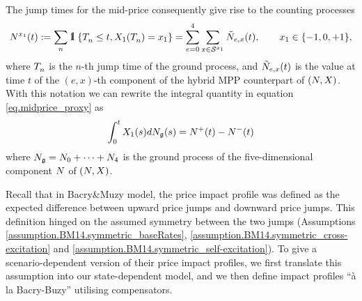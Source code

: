 \documentclass[10pt]{article}
\begin{document}
The jump times for the mid-price consequently give rise to the counting processes 
\begin{equation}\label{eq.jump_times}
 \countingProc[]^{x_{1}}(t) := \sum_{n}\one\left\lbrace \arrivalTimes[]_n\leq t , \stateVariable_1(\arrivalTimes[]_n) = x_1 \right\rbrace
 =
 \sum_{e=0}^{4} \sum_{x\in\stateSpace^{x_1}} \hybridHawkes_{e,x}(t),
 \qquad x_1 \in \lbrace-1,0,+1\rbrace,
\end{equation}
where $\arrivalTimes[]_n$ is the $n$-th jump time of the ground process, and $\hybridHawkes_{e,x}(t)$ is the value at time $t$ of the $(e,x)$-th component of the hybrid MPP counterpart of $(\multiCountingProc,\stateVariable)$.
With this notation we can rewrite the integral quantity in equation \eqref{eq.midprice_proxy} as 
\begin{equation*}
 \intzerot \stateVariable_1 (s)d\groundProc(s)
 =
 \countingProc[]^{+}(t) - \countingProc[]^{-}(t)
\end{equation*}
where $\groundProc = \countingProc[0] + \dots + \countingProc[4]$ is the ground process of the five-dimensional component $\multiCountingProc$ of $(\multiCountingProc,\stateVariable)$.

Recall that in Bacry\&Muzy model, the price impact profile was defined as the expected difference between upward price jumps and downward price jumps. This definition hinged on the assumed symmetry between the two jumps (Assumptions \ref{assumption.BM14.symmetric_baseRates}, \ref{assumption.BM14.symmetric_cross-excitation} and \ref{assumption.BM14.symmetric_self-excitation}). To give a scenario-dependent version of their price impact profiles, we first translate this assumption into our state-dependent model, and we then define impact profiles ``\`a la Bacry-Buzy'' utilising compensators. 
\end{document}

